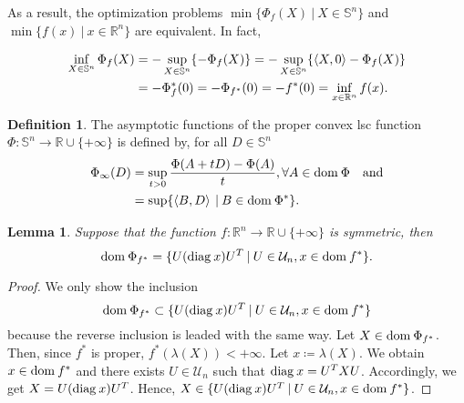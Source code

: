 \documentclass[a4paper,11pt, oneside]{book}
\newtheorem{lem}[thm]{Lemma}
\theoremstyle{definition}
\newtheorem{dfn}[thm]{Definition}
\newcommand{\RealNumberSet}{\mathbb{R}}
\newcommand{\NDemenstionalRealEuclideanSpace}{\mathbb{R}^n}
\newcommand{\NDemenstionalRealSymmetricMatrixSpace}{\mathbb{S}^n}
\newcommand{\NDemenstionalRealOthonormalMatrixSpace}{\mathcal{U}_n}
\newcommand{\Domain}[1]{\text{\rm dom\:${#1}$}} %
\newcommand{\Diagnosis}[1]{\text{\rm diag\:${#1}$}} %
\newcommand{\InnerProduct}[2]{\left\langle {#1},{#2}\right\rangle} %
\newcommand{\ExtendedRealValuedFunction}[2]{{#1}: {#2} \to \RealNumberSet \cup \{+\infty\}}
\newcommand{\ConjugateFunction}[1]{{#1}^*}
\newcommand{\SetForm}[2]{
  \{{#1}\:|\:{#2}\}
}
\begin{document}
As a result, the optimization problems $\min \{\Phi_{f}(X) \:|\: X \in \NDemenstionalRealSymmetricMatrixSpace\}$ and $\min \{f(x) \:|\: x \in \NDemenstionalRealEuclideanSpace\}$ are equivalent. In fact,

\begin{align}
  \inf_{X \in \NDemenstionalRealSymmetricMatrixSpace} \Phi_{f}(X) &= - \sup_{X \in \NDemenstionalRealSymmetricMatrixSpace} \{- \Phi_{f}(X)\} = - \sup_{X \in \NDemenstionalRealSymmetricMatrixSpace} \{\InnerProduct{X}{0} - \Phi_{f}(X)\} \notag \\
  &= - \Phi^*_{f}(0) = - \Phi_{\ConjugateFunction{f}}(0) = - \ConjugateFunction{f}(0) = \inf_{x \in \NDemenstionalRealEuclideanSpace} f(x). \notag
\end{align}

\begin{dfn}
  The asymptotic functions of the proper convex lsc function $\ExtendedRealValuedFunction{\Phi}{\NDemenstionalRealSymmetricMatrixSpace}$ is defined by, for all $D \in \NDemenstionalRealSymmetricMatrixSpace$
  \begin{equation}
    \begin{split}
      \Phi_{\infty} (D) &= \sup_{t > 0} \frac{\Phi(A+tD) -\Phi(A)}{t}, \forall A \in \Domain{\Phi} \quad \text{and} \\
      &= \sup \{\InnerProduct{B}{D} \:|\: B \in \Domain{\ConjugateFunction{\Phi}}\}. \notag
    \end{split}
  \end{equation}
\end{dfn}

\begin{lem}\label{lemma1ForSeeger97}
  Suppose that the function $\ExtendedRealValuedFunction{f}{\NDemenstionalRealEuclideanSpace}$ is symmetric, then
  \begin{equation}
    \Domain{\Phi_{\ConjugateFunction{f}}} = \SetForm{U (\Diagnosis{x}) U^T}{U \in \NDemenstionalRealOthonormalMatrixSpace, x \in \Domain{\ConjugateFunction{f}}}. \notag
  \end{equation}
\end{lem}

\begin{proof}
  We only show the inclusion
  \begin{equation}
    \Domain{\Phi_{\ConjugateFunction{f}}} \subset \SetForm{U (\Diagnosis{x}) U^T}{U \in \NDemenstionalRealOthonormalMatrixSpace, x \in \Domain{\ConjugateFunction{f}}} \notag
  \end{equation}
  because the reverse inclusion is leaded with the same way. Let $X \in \Domain{\Phi_{\ConjugateFunction{f}}}$. Then, since $\ConjugateFunction{f}$ is proper, $\ConjugateFunction{f}(\lambda(X)) < +\infty$. Let $x \coloneqq \lambda(X)$. We obtain $x \in \Domain{\ConjugateFunction{f}}$ and there exists $U \in \NDemenstionalRealOthonormalMatrixSpace$ such that $\Diagnosis{x} = U^TXU$. Accordingly, we get $X = U(\Diagnosis{x})U^T$. Hence, $X \in \SetForm{U (\Diagnosis{x}) U^T}{U \in \NDemenstionalRealOthonormalMatrixSpace, x \in \Domain{\ConjugateFunction{f}}}$.
\end{proof}
\end{document}
